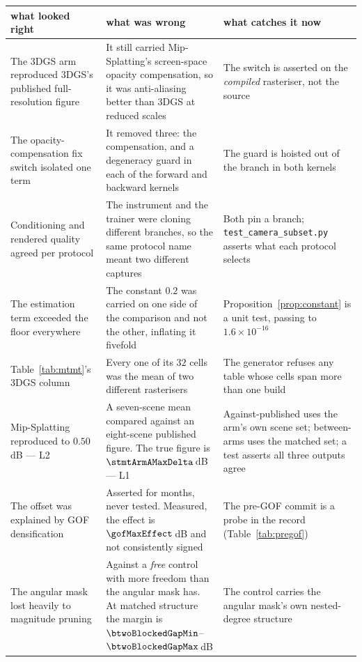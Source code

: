 \begin{center}\small
\begin{tabularx}{\linewidth}{L{1}L{1}L{1}}
  \toprule
  what looked right & what was wrong & what catches it now \\
  \midrule
  The 3DGS arm reproduced 3DGS's published full-resolution figure &
  It still carried Mip-Splatting's screen-space opacity compensation, so it was
  anti-aliasing better than 3DGS at reduced scales &
  The switch is asserted on the \emph{compiled} rasteriser, not the source \\
  \addlinespace
  The opacity-compensation fix switch isolated one term &
  It removed three: the compensation, and a degeneracy guard in each of the
  forward and backward kernels &
  The guard is hoisted out of the branch in both kernels \\
  \addlinespace
  Conditioning and rendered quality agreed per protocol &
  The instrument and the trainer were cloning different branches, so the same
  protocol name meant two different captures &
  Both pin a branch; \texttt{test\_camera\_subset.py} asserts what each protocol
  selects \\
  \addlinespace
  The estimation term exceeded the floor everywhere &
  The constant $0.2$ was carried on one side of the comparison and not the other,
  inflating it fivefold &
  Proposition~\ref{prop:constant} is a unit test, passing to $1.6\times10^{-16}$ \\
  \addlinespace
  Table~\ref{tab:mtmt}'s 3DGS column &
  Every one of its $32$ cells was the mean of two different rasterisers &
  The generator refuses any table whose cells span more than one build \\
  \addlinespace
  Mip-Splatting reproduced to $0.50$\,dB --- L2 &
  A seven-scene mean compared against an eight-scene published figure. The true
  figure is $\stmtArmAMaxDelta$\,dB --- L1 &
  Against-published uses the arm's own scene set; between-arms uses the matched
  set; a test asserts all three outputs agree \\
  \addlinespace
  The offset was explained by GOF densification &
  Asserted for months, never tested. Measured, the effect is
  $\gofMaxEffect$\,dB and not consistently signed &
  The pre-GOF commit is a probe in the record (Table~\ref{tab:pregof}) \\
  \addlinespace
  The angular mask lost heavily to magnitude pruning &
  Against a \emph{free} control with more freedom than the angular mask has. At matched
  structure the margin is $\btwoBlockedGapMin$--$\btwoBlockedGapMax$\,dB &
  The control carries the angular mask's own nested-degree structure \\
  \bottomrule
\end{tabularx}
\end{center}

